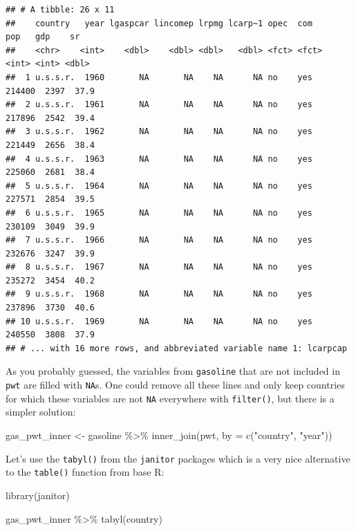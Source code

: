 \documentclass[
]{article}
\newenvironment{Shaded}{\begin{snugshade}}{\end{snugshade}}
\newcommand{\AttributeTok}[1]{\textcolor[rgb]{0.77,0.63,0.00}{#1}}
\newcommand{\FunctionTok}[1]{\textcolor[rgb]{0.00,0.00,0.00}{#1}}
\newcommand{\NormalTok}[1]{#1}
\newcommand{\OtherTok}[1]{\textcolor[rgb]{0.56,0.35,0.01}{#1}}
\newcommand{\SpecialCharTok}[1]{\textcolor[rgb]{0.00,0.00,0.00}{#1}}
\newcommand{\StringTok}[1]{\textcolor[rgb]{0.31,0.60,0.02}{#1}}
\begin{document}
\begin{verbatim}
## # A tibble: 26 x 11
##    country   year lgaspcar lincomep lrpmg lcarp~1 opec  com      pop   gdp    sr
##    <chr>    <int>    <dbl>    <dbl> <dbl>   <dbl> <fct> <fct>  <int> <int> <dbl>
##  1 u.s.s.r.  1960       NA       NA    NA      NA no    yes   214400  2397  37.9
##  2 u.s.s.r.  1961       NA       NA    NA      NA no    yes   217896  2542  39.4
##  3 u.s.s.r.  1962       NA       NA    NA      NA no    yes   221449  2656  38.4
##  4 u.s.s.r.  1963       NA       NA    NA      NA no    yes   225060  2681  38.4
##  5 u.s.s.r.  1964       NA       NA    NA      NA no    yes   227571  2854  39.5
##  6 u.s.s.r.  1965       NA       NA    NA      NA no    yes   230109  3049  39.9
##  7 u.s.s.r.  1966       NA       NA    NA      NA no    yes   232676  3247  39.9
##  8 u.s.s.r.  1967       NA       NA    NA      NA no    yes   235272  3454  40.2
##  9 u.s.s.r.  1968       NA       NA    NA      NA no    yes   237896  3730  40.6
## 10 u.s.s.r.  1969       NA       NA    NA      NA no    yes   240550  3808  37.9
## # ... with 16 more rows, and abbreviated variable name 1: lcarpcap
\end{verbatim}

As you probably guessed, the variables from \texttt{gasoline} that are not included in \texttt{pwt} are filled with
\texttt{NA}s. One could remove all these lines and only keep countries for which these variables are not
\texttt{NA} everywhere with \texttt{filter()}, but there is a simpler solution:

\begin{Shaded}
\begin{Highlighting}[]
\NormalTok{gas\_pwt\_inner }\OtherTok{\textless{}{-}}\NormalTok{ gasoline }\SpecialCharTok{\%\textgreater{}\%}
  \FunctionTok{inner\_join}\NormalTok{(pwt, }\AttributeTok{by =} \FunctionTok{c}\NormalTok{(}\StringTok{"country"}\NormalTok{, }\StringTok{"year"}\NormalTok{))}
\end{Highlighting}
\end{Shaded}

Let's use the \texttt{tabyl()} from the \texttt{janitor} packages which is a very nice alternative to the \texttt{table()}
function from base R:

\begin{Shaded}
\begin{Highlighting}[]
\FunctionTok{library}\NormalTok{(janitor)}

\NormalTok{gas\_pwt\_inner }\SpecialCharTok{\%\textgreater{}\%}
  \FunctionTok{tabyl}\NormalTok{(country)}
\end{Highlighting}
\end{Shaded}
\end{document}
